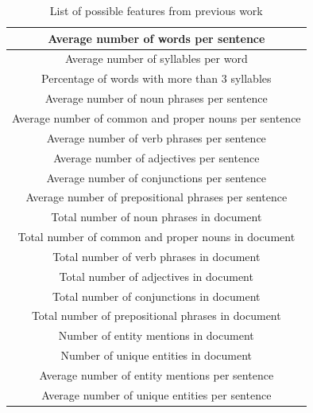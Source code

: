 \documentclass[]{article}
\begin{document}
\begin{table}[!htbp]
	\begin{center}
		\begin{tabular}{| c |} \hline
			Average number of words per sentence \\ \hline
			Average number of syllables per word \\ \hline
			Percentage of words with more than 3 syllables \\ \hline
			Average number of noun phrases per sentence \\ \hline
			Average number of common and proper nouns per sentence \\ \hline
			Average number of verb phrases per sentence \\ \hline
			Average number of adjectives per sentence \\  \hline
			Average number of conjunctions per sentence \\ \hline
			Average number of prepositional phrases per sentence \\ \hline
			Total number of noun phrases in document \\ \hline
			Total number of common and proper nouns in document \\ \hline
			Total number of verb phrases in document \\ \hline
			Total number of adjectives in document \\ \hline
			Total number of conjunctions in document \\ \hline
			Total number of prepositional phrases in document \\ \hline
			Number of entity mentions in document \\ \hline
			Number of unique entities in document \\ \hline
			Average number of entity mentions per sentence \\ \hline
			Average number of unique entities per sentence \\ \hline
		\end{tabular}
	\end{center}
	\caption{List of possible features from previous work\cite{}}
	\label{table:features1}
\end{table}
\end{document}
